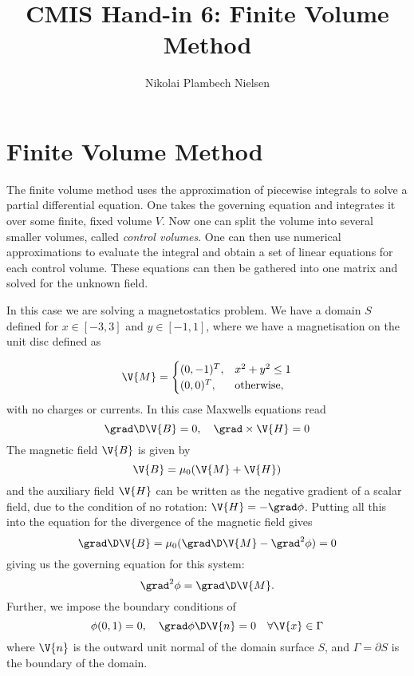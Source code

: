 \documentclass[sigconf]{acmart}
\begin{document}
%
\title{CMIS Hand-in 6: Finite Volume Method}

\author{Nikolai Plambech Nielsen}


\maketitle

\section{Finite Volume Method}
The finite volume method uses the approximation of piecewise integrals to solve a partial differential equation. One takes the governing equation and integrates it over some finite, fixed volume $ V $. Now one can split the volume into several smaller volumes, called \textit{control volumes}. One can then use numerical approximations to evaluate the integral and obtain a set of linear equations for each control volume. These equations can then be gathered into one matrix and solved for the unknown field.

In this case we are solving a magnetostatics problem. We have a domain $ S $ defined for $ x \in [-3, 3] $ and $ y \in [-1, 1] $, where we have a magnetisation on the unit disc defined as

\begin{equation}\label{key}
	\V{M} = \begin{cases}
	(0, -1)^T, &  x^2+y^2 \leq 1 \\
	(0,0)^T, & \text{otherwise},
	\end{cases}
\end{equation}
with no charges or currents. In this case Maxwells equations read
\begin{equation}\label{key}
	\grad \D \V{B} = 0, \quad \grad \times \V{H} = 0
\end{equation}
The magnetic field $ \V{B} $ is given by
\begin{equation}\label{key}
	\V{B} = \mu_0 ( \V{M} + \V{H})
\end{equation}
and the auxiliary field $ \V{H} $ can be written as the negative gradient of a scalar field, due to the condition of no rotation: $ \V{H} = -\grad \phi $. Putting all this into the equation for the divergence of the magnetic field gives
\begin{equation}\label{key}
	\grad \D \V{B} = \mu_0(\grad \D \V{M} - \grad^2 \phi) = 0
\end{equation}
giving us the governing equation for this system:
\begin{equation}\label{key}
	\grad^2 \phi = \grad \D \V{M}.
\end{equation}
Further, we impose the boundary conditions of
\begin{equation}\label{key}
	\phi(0,1) = 0, \quad \grad\phi\D \V{n} = 0 \quad \forall \V{x} \in \Gamma
\end{equation}
where $ \V{n} $ is the outward unit normal of the domain surface $ S $, and $ \Gamma = \partial S$ is the boundary of the domain.
\end{document}
